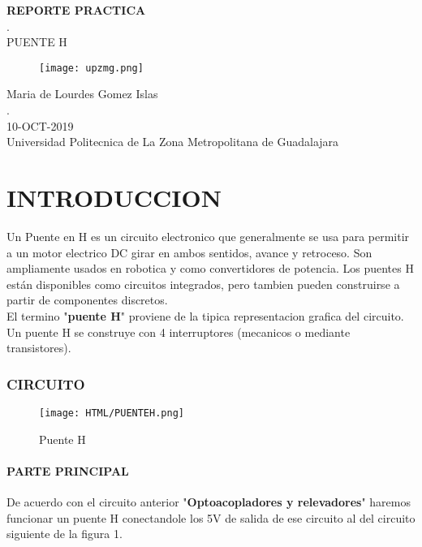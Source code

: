 \documentclass[11pt,a4paper]{article}
\begin{document}
\begin{center}
\textbf{REPORTE PRACTICA}\\
.\\
PUENTE H\\
\end{center}

\begin{figure}[h]
\centering
\texttt{[image: upzmg.png]} 
\end{figure}

\begin{center}
Maria de Lourdes Gomez Islas\\
.\\
10-OCT-2019\\
Universidad Politecnica de La Zona Metropolitana de Guadalajara
\end{center}

\newpage 

\part{INTRODUCCION}
Un Puente en H es un circuito electronico que generalmente se usa para permitir a un motor electrico DC girar en ambos sentidos, avance y retroceso. Son ampliamente usados en robotica y como convertidores de potencia. Los puentes H están disponibles como circuitos integrados, pero tambien pueden construirse a partir de componentes discretos.\\
El termino "\textbf{puente H}" proviene de la tipica representacion grafica del circuito. Un puente H se construye con 4 interruptores (mecanicos o mediante transistores).

\section{CIRCUITO}

\begin{figure}[h]
\centering
\texttt{[image: HTML/PUENTEH.png]} 
\caption{Puente H}
\end{figure}

\subsection{PARTE PRINCIPAL}
De acuerdo con el circuito anterior "\textbf{Optoacopladores y relevadores}" haremos funcionar un puente H conectandole los 5V de salida de ese circuito al del circuito siguiente de la figura 1.
\end{document}
